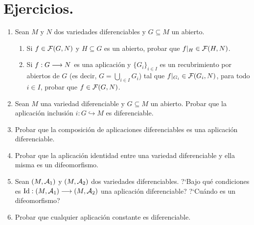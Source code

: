\documentclass[cursovd_portada.tex]{subfiles}
\begin{document}
\section{Ejercicios.}
\begin{enumerate}
\item Sean $M$ y $N$ dos variedades diferenciables y $G\subseteq M$ un abierto.
\begin{enumerate}
\item Si $f\in{\cal F}(G,N)$ y $H\subseteq G$ es un abierto, probar que $f|_H\in{\cal F}(H,N)$.
\item Si $f:G\longrightarrow N$ es una aplicación y $\{G_i\}_{i\in I}$ es un recubrimiento por abiertos de $G$ (es decir,
$G=\bigcup_{i\in I}G_i$) tal que $f|_{G_i}\in{\cal F}(G_i,N)$, para todo $i\in I$, probar que $f\in{\cal F}(G,N)$.
\end{enumerate}
\item Sean $M$ una variedad diferenciable y $G\subseteq M$ un
abierto. Probar que la aplicación inclusión
$i:G\hookrightarrow M$ es diferenciable. \item Probar que la
composición de aplicaciones diferenciables es una
aplicación diferenciable. \item Probar que la aplicación
identidad entre una variedad diferenciable y ella misma es un
difeomorfismo. \item Sean $(M,{\cal A}_1)$ y $(M,{\cal A}_2)$ dos
variedades diferenciables. ?`Bajo qué condiciones es ${\rm
Id}: (M,{\cal A}_1)\longrightarrow (M,{\cal A}_2)$ una aplicación
diferenciable? ?`Cuándo es un difeomorfismo? \item Probar que
cualquier aplicación constante es diferenciable. %
\end{enumerate}
\end{document}
